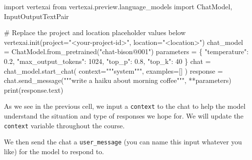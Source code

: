 \documentclass[
  letterpaper,
  DIV=11,
  numbers=noendperiod]{scrreprt}
\newenvironment{Shaded}{\begin{snugshade}}{\end{snugshade}}
\newcommand{\BuiltInTok}[1]{\textcolor[rgb]{0.00,0.23,0.31}{#1}}
\newcommand{\CommentTok}[1]{\textcolor[rgb]{0.37,0.37,0.37}{#1}}
\newcommand{\DecValTok}[1]{\textcolor[rgb]{0.68,0.00,0.00}{#1}}
\newcommand{\FloatTok}[1]{\textcolor[rgb]{0.68,0.00,0.00}{#1}}
\newcommand{\ImportTok}[1]{\textcolor[rgb]{0.00,0.46,0.62}{#1}}
\newcommand{\NormalTok}[1]{\textcolor[rgb]{0.00,0.23,0.31}{#1}}
\newcommand{\OperatorTok}[1]{\textcolor[rgb]{0.37,0.37,0.37}{#1}}
\newcommand{\StringTok}[1]{\textcolor[rgb]{0.13,0.47,0.30}{#1}}
\begin{document}
\begin{Shaded}
\begin{Highlighting}[]
\ImportTok{import}\NormalTok{ vertexai}
\ImportTok{from}\NormalTok{ vertexai.preview.language\_models }\ImportTok{import}\NormalTok{ ChatModel, InputOutputTextPair}

\CommentTok{\# Replace the project and location placeholder values below}
\NormalTok{vertexai.init(project}\OperatorTok{=}\StringTok{"\textless{}your{-}project{-}id\textgreater{}"}\NormalTok{, location}\OperatorTok{=}\StringTok{"\textless{}location\textgreater{}"}\NormalTok{)}
\NormalTok{chat\_model }\OperatorTok{=}\NormalTok{ ChatModel.from\_pretrained(}\StringTok{"chat{-}bison@001"}\NormalTok{)}
\NormalTok{parameters }\OperatorTok{=}\NormalTok{ \{}
    \StringTok{"temperature"}\NormalTok{: }\FloatTok{0.2}\NormalTok{,}
    \StringTok{"max\_output\_tokens"}\NormalTok{: }\DecValTok{1024}\NormalTok{,}
    \StringTok{"top\_p"}\NormalTok{: }\FloatTok{0.8}\NormalTok{,}
    \StringTok{"top\_k"}\NormalTok{: }\DecValTok{40}
\NormalTok{\}}
\NormalTok{chat }\OperatorTok{=}\NormalTok{ chat\_model.start\_chat(}
\NormalTok{    context}\OperatorTok{=}\StringTok{"""system"""}\NormalTok{,}
\NormalTok{    examples}\OperatorTok{=}\NormalTok{[]}
\NormalTok{)}
\NormalTok{response }\OperatorTok{=}\NormalTok{ chat.send\_message(}\StringTok{"""write a haiku about morning coffee"""}\NormalTok{, }\OperatorTok{**}\NormalTok{parameters)}
\BuiltInTok{print}\NormalTok{(response.text)}
\end{Highlighting}
\end{Shaded}

As we see in the previous cell, we input a \texttt{context} to the chat
to help the model understand the situation and type of responses we hope
for. We will update the \texttt{context} variable throughout the course.

We then send the chat a \texttt{user\_message} (you can name this input
whatever you like) for the model to respond to.
\end{document}
